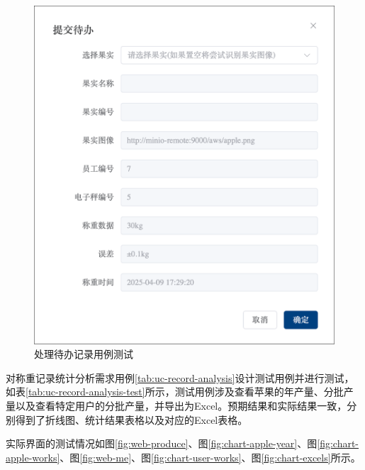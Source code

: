 \begin{figure}
    \centering
    \includegraphics[height=0.5\textheight]{../result/form-todo-handle.png}
    \caption{处理待办记录用例测试}
    \label{fig:form-todo-handle}
\end{figure}

对称重记录统计分析需求用例\ref{tab:uc-record-analysis}设计测试用例并进行测试，如表\ref{tab:uc-record-analysis-test}所示，测试用例涉及查看苹果的年产量、分批产量以及查看特定用户的分批产量，并导出为Excel。预期结果和实际结果一致，分别得到了折线图、统计结果表格以及对应的Excel表格。

实际界面的测试情况如图\ref{fig:web-produce}、图\ref{fig:chart-apple-year}、图\ref{fig:chart-apple-works}、图\ref{fig:web-me}、图\ref{fig:chart-user-works}、图\ref{fig:chart-excels}所示。

